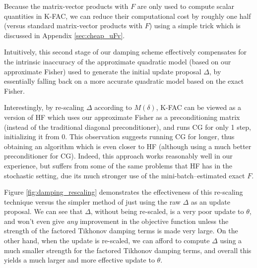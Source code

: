 \documentclass[12pt]{article}
\newcommand{\acronym}{K-FAC}
\begin{document}
Because the matrix-vector products with $F$ are only used to compute scalar quantities in \acronym{}, we can reduce their computational cost by roughly one half (versus standard matrix-vector products with $F$) using a simple trick which is discussed in Appendix \ref{sec:cheap_uFv}.

Intuitively, this second stage of our damping scheme effectively compensates for the intrinsic inaccuracy of the approximate quadratic model (based on our approximate Fisher) used to generate the initial update proposal $\Delta$, by essentially falling back on a more accurate quadratic model based on the exact Fisher.

Interestingly, by re-scaling $\Delta$ according to $M(\delta)$, \acronym{} can be viewed as a version of HF which uses our approximate Fisher as a preconditioning matrix (instead of the traditional diagonal preconditioner), and runs CG for only 1 step, initializing it from 0.  This observation suggests running CG for longer, thus obtaining an algorithm which is even closer to HF (although using a much better preconditioner for CG).  Indeed, this approach works reasonably well in our experience, but suffers from some of the same problems that HF has in the stochastic setting, due its much stronger use of the mini-batch--estimated exact $F$.

Figure \ref{fig:damping_rescaling} demonstrates the effectiveness of this re-scaling technique versus the simpler method of just using the raw $\Delta$ as an update proposal.  We can see that $\Delta$, without being re-scaled, is a very poor update to $\theta$, and won't even give \emph{any} improvement in the objective function unless the strength of the factored Tikhonov damping terms is made very large.  On the other hand, when the update is re-scaled, we can afford to compute $\Delta$ using a much smaller strength for the factored Tikhonov damping terms, and overall this yields a much larger and more effective update to $\theta$.
\end{document}
